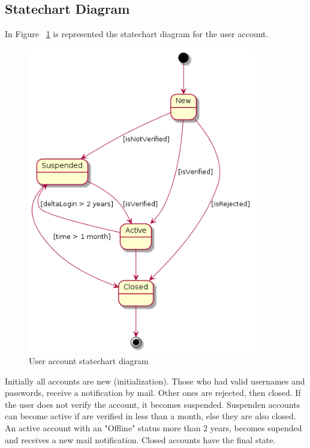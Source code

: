 \documentclass[12pt,a4paper,titlepage]{article}
\begin{document}
\subsection{Statechart Diagram}
In Figure ~\ref{fig:6userAccount} is represented the statechart diagram for the user account.
\begin{figure}[H]
\centering
	\includegraphics[width=10cm]{6userAccount}
	\caption{User account statechart diagram}
	\label{fig:6userAccount}
\end{figure}
Initially all accounts are new (initialization). Those who had valid usernames and passwords, receive a notification by mail. Other ones are rejected, then closed. If the user does not verify the account, it becomes suspended. Suspenden accounts can become active if are verified in less than a month, else they are also closed. An active account with an "Offline" status more than 2 years, becomes supended and receives a new mail notification. Closed accounts have the final state.
\end{document}
